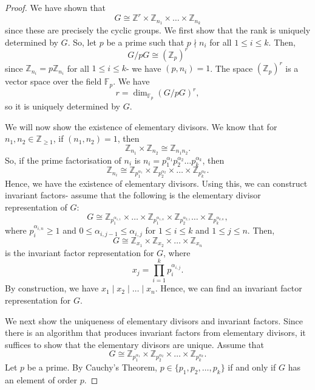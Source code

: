 \documentclass[a4paper, openany]{memoir}
\theoremstyle{definition}
\theoremstyle{plain}
\begin{document}
    \begin{proof}
        We have shown that
        \[G \cong \mathbb{Z}^r \times \mathbb{Z}_{n_1} \times \dots \times \mathbb{Z}_{n_k}\]
        since these are precisely the cyclic groups. We first show that the rank is uniquely determined by $G$. So, let $p$ be a prime such that $p \nmid n_i$ for all $1 \leq i \leq k$. Then, 
        \[G/pG \cong (\mathbb{Z}_p)^r\]
        since $\mathbb{Z}_{n_i} = p\mathbb{Z}_{n_i}$ for all $1 \leq i \leq k$- we have $(p, n_i) = 1$. The space $(\mathbb{Z}_p)^r$ is a vector space over the field $\mathbb{F}_p$. We have
        \[r = \dim_{\mathbb{F}_p} (G/pG)^r,\]
        so it is uniquely determined by $G$.
        
        We will now show the existence of elementary divisors. We know that for $n_1, n_2 \in \mathbb{Z}_{\geq 1}$, if $(n_1, n_2) = 1$, then
        \[\mathbb{Z}_{n_1} \times \mathbb{Z}_{n_2} \cong \mathbb{Z}_{n_1 n_2}.\]
        So, if the prime factorisation of $n_i$ is $n_i = p_1^{\alpha_1} p_2^{\alpha_2} \dots p_k^{\alpha_k}$, then
        \[\mathbb{Z}_{n_i} \cong \mathbb{Z}_{p_1^{\alpha_1}} \times \mathbb{Z}_{p_2^{\alpha_2}} \times \dots \times \mathbb{Z}_{p_k^{\alpha_k}}.\]
        Hence, we have the existence of elementary divisors. Using this, we can construct invariant factors- assume that the following is the elementary divisor representation of $G$:
        \[G \cong \mathbb{Z}_{p_1^{\alpha_{1, 1}}} \times \dots \times \mathbb{Z}_{p_1^{\alpha_{1, n}}} \times \mathbb{Z}_{p_2^{\alpha_{2, 1}}} \dots \times \mathbb{Z}_{p_k^{\alpha_{k, n}}},\]
        where $p_i^{\alpha_{i, n}} \geq 1$ and $0 \leq \alpha_{i, j-1} \leq \alpha_{i, j}$ for $1 \leq i \leq k$ and $1 \leq j \leq n$. Then,
        \[G \cong \mathbb{Z}_{x_1} \times \mathbb{Z}_{x_2} \times \dots \times \mathbb{Z}_{x_n}\]
        is the invariant factor representation for $G$, where
        \[x_j = \prod_{i=1}^k p_i^{\alpha_{i, j}}.\]
        By construction, we have $x_1 \mid x_2 \mid \dots \mid x_n$. Hence, we can find an invariant factor representation for $G$.

        We next show the uniqueness of elementary divisors and invariant factors. Since there is an algorithm that produces invariant factors from elementary divisors, it suffices to show that the elementary divisors are unique. Assume that 
        \[G \cong \mathbb{Z}_{p_1^{\alpha_1}} \times \mathbb{Z}_{p_2^{\alpha_2}} \times \dots \times \mathbb{Z}_{p_k^{\alpha_k}}.\]
        Let $p$ be a prime. By Cauchy's Theorem, $p \in \{p_1, p_2, \dots, p_k\}$ if and only if $G$ has an element of order $p$.
    \end{proof}
\end{document}
